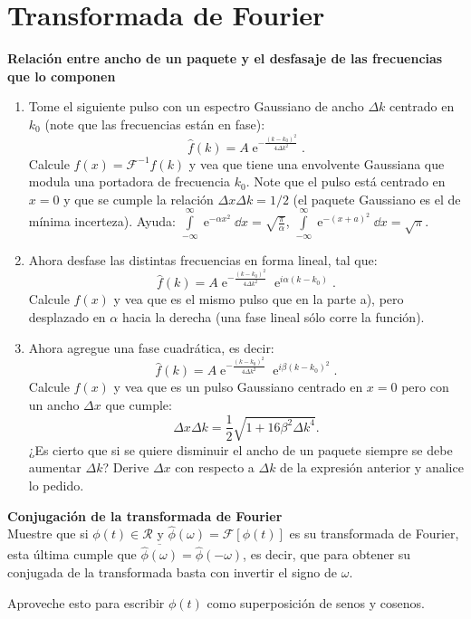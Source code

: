 \section*{Transformada de Fourier}

\item 
\textbf{Relación entre ancho de un paquete y el desfasaje de las frecuencias que lo componen}
\begin{enumerate}
	\item Tome el siguiente pulso con un espectro Gaussiano de ancho $\Delta k$ centrado en $k_0$ (note que las frecuencias están en fase):
$$
\hat{f}(k)=A \operatorname{e}^{-\frac{ ( k - k_0 )^2 }{ 4 \Delta k^2 } }.
$$
Calcule $f(x) = \mathcal{F}^{-1} \hat{f}(k)$ y vea que tiene una envolvente Gaussiana que modula una portadora de frecuencia $k_{0}$.
Note que el pulso está centrado en $x=0$ y que se cumple la relación $\Delta x \Delta k = 1/2$ (el paquete Gaussiano es el de mínima incerteza).
Ayuda: \( \int\limits_{-\infty}^{\infty} \operatorname{e}^{-\alpha x^2} \dd{x} = \sqrt{\frac{\pi}{\alpha} } \), \( \int\limits_{-\infty}^{\infty} \operatorname{e}^{-(x+ a)^2} \dd{x} = \sqrt{\pi}\).
	\item Ahora desfase las distintas frecuencias en forma lineal, tal que:
$$
\hat{f}(k)=A \operatorname{e}^{ -\frac{ ( k - k_0 )^2 }{ 4 \Delta k^2 } } \operatorname{e}^{ i \alpha (k - k_0 ) }.
$$
Calcule $f(x)$ y vea que es el mismo pulso que en la parte a), pero desplazado en $\alpha$ hacia la derecha (una fase lineal sólo corre la función).
	\item Ahora agregue una fase cuadrática, es decir:
$$
\hat{f}(k) = A \operatorname{e}^{-\frac{(k-k_{0})^{2}}{4\Delta k^{2}} } \operatorname{e}^{i \beta ( k - k_0 )^2 }.
$$
Calcule $f(x)$ y vea que es un pulso Gaussiano centrado en $x=0$ pero con un ancho $\Delta x$ que cumple:
$$
\Delta x \Delta k = \frac{1}{2} \sqrt{ 1 + 16 \beta^2 \Delta k^4 }.
$$
¿Es cierto que si se quiere disminuir el ancho de un paquete siempre se debe aumentar $\Delta k$?
Derive $\Delta x$ con respecto a $\Delta k$ de la expresión anterior y analice lo pedido.
\end{enumerate}



\item \textbf{Conjugación de la transformada de Fourier}\\
Muestre que si $\phi(t) \in \mathcal{R}$ y $\hat{\phi }(\omega)= \mathcal{F} \left[ \phi (t) \right]$ es su transformada de Fourier, esta última cumple que \( \overline{\hat{\phi } (\omega) } = \hat{\phi }(- \omega) \), es decir, que para obtener su conjugada de la transformada basta con invertir el signo de $\omega$.

Aproveche esto para escribir $\phi(t)$ como superposición de senos y cosenos.
